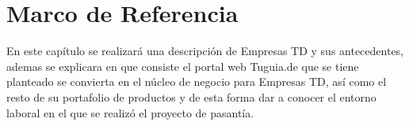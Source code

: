 \chapter{Marco de Referencia} \label{chap:marco_refencia}

\vspace{5 mm}

En este capítulo se realizará una descripción de Empresas TD y sus antecedentes, ademas se explicara en que consiste el portal web Tuguia.de que se tiene planteado se convierta en el núcleo de negocio para Empresas TD, así como el resto de su portafolio de productos y de esta forma dar a conocer el entorno laboral en el que se realizó el proyecto de pasantía.

  